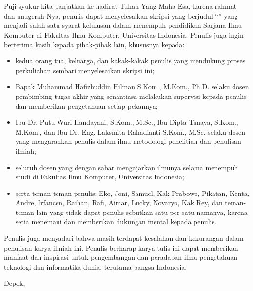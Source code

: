 \chapter*{\kataPengantar}
\pagestyle{first-pages}

Puji syukur kita panjatkan ke hadirat Tuhan Yang Maha Esa, karena rahmat dan anugerah-Nya, penulis dapat menyelesaikan skripsi yang berjudul “\judul” yang menjadi salah satu syarat kelulusan dalam menempuh pendidikan Sarjana Ilmu Komputer di  Fakultas Ilmu Komputer, Universitas Indonesia. Penulis juga ingin berterima kasih kepada pihak-pihak lain, khususnya kepada:

\begin{itemize}
    \setlength\itemsep{-0.5em}
    \item kedua orang tua, keluarga, dan kakak-kakak penulis yang mendukung proses perkuliahan sembari menyelesaikan skripsi ini;
    \item Bapak Muhammad Hafizhuddin Hilman S.Kom., M.Kom., Ph.D. selaku dosen pembimbing tugas akhir yang senantiasa melakukan supervisi kepada penulis dan memberikan pengetahuan setiap pekannya;
    \item Ibu Dr. Putu Wuri Handayani, S.Kom., M.Sc., Ibu Dipta Tanaya, S.Kom., M.Kom., dan Ibu Dr. Eng. Laksmita Rahadianti S.Kom., M.Sc. selaku dosen yang mengarahkan penulis dalam ilmu metodologi penelitian dan penulisan ilmiah;
    \item seluruh dosen yang dengan sabar mengajarkan ilmunya selama menempuh studi di Fakultas Ilmu Komputer, Universitas Indonesia;
    \item serta teman-teman penulis: Eko, Joni, Samuel, Kak Prabowo, Pikatan, Kenta, Andre, Irfancen, Raihan, Rafi, Aimar, Lucky, Novaryo, Kak Rey, dan teman-teman lain yang tidak dapat penulis sebutkan satu per satu namanya, karena setia menemani dan memberikan dukungan mental kepada penulis.
\end{itemize}

Penulis juga menyadari bahwa masih terdapat kesalahan dan kekurangan dalam penulisan karya ilmiah ini. Penulis berharap karya tulis ini dapat memberikan manfaat dan inspirasi untuk pengembangan dan peradaban ilmu pengetahuan teknologi dan informatika dunia, terutama bangsa Indonesia.

\vspace*{0.1cm}
\begin{flushright}
Depok, \tanggalSiapSidang\\[0.1cm]
\vspace*{1.5cm}
\penulis

\end{flushright}
